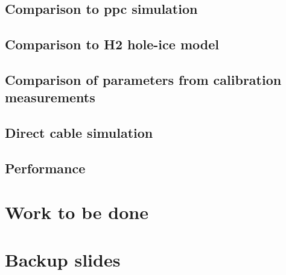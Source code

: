 \documentclass[green, 12pt]{beamer}
\begin{document}
  \subsection{Comparison to ppc simulation}
    
  \subsection{Comparison to H2 hole-ice model}
    
  \subsection{Comparison of parameters from calibration measurements}
    
  \subsection{Direct cable simulation}
    
  \subsection{Performance}
    

  \section{Work to be done}
    
    



\appendix
\section{Backup slides}













\end{document}
